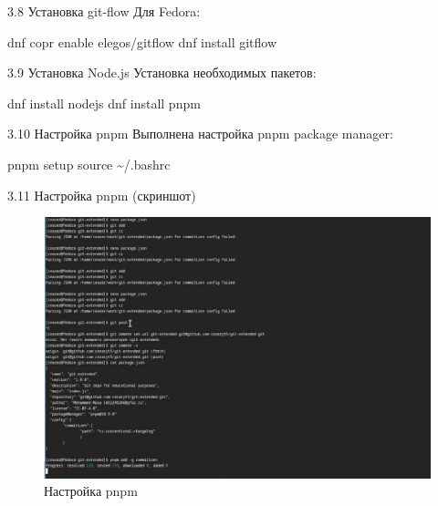 \documentclass[
  ignorenonframetext,
  aspectratio=169,
  russian,
]{beamer}
\newenvironment{Shaded}{\begin{snugshade}}{\end{snugshade}}
\newcommand{\BuiltInTok}[1]{\textcolor[rgb]{0.00,0.23,0.31}{#1}}
\newcommand{\ExtensionTok}[1]{\textcolor[rgb]{0.00,0.23,0.31}{#1}}
\newcommand{\NormalTok}[1]{\textcolor[rgb]{0.00,0.23,0.31}{#1}}
\begin{document}
\begin{frame}[fragile]{3.8 Установка git-flow}
\label{ux443ux441ux442ux430ux43dux43eux432ux43aux430-git-flow}
Для Fedora:

\begin{Shaded}
\begin{Highlighting}[]
\ExtensionTok{dnf}\NormalTok{ copr enable elegos/gitflow}
\ExtensionTok{dnf}\NormalTok{ install gitflow}
\end{Highlighting}
\end{Shaded}
\end{frame}

\begin{frame}[fragile]{3.9 Установка Node.js}
\label{ux443ux441ux442ux430ux43dux43eux432ux43aux430-node.js}
Установка необходимых пакетов:

\begin{Shaded}
\begin{Highlighting}[]
\ExtensionTok{dnf}\NormalTok{ install nodejs}
\ExtensionTok{dnf}\NormalTok{ install pnpm}
\end{Highlighting}
\end{Shaded}
\end{frame}

\begin{frame}[fragile]{3.10 Настройка pnpm}
\label{ux43dux430ux441ux442ux440ux43eux439ux43aux430-pnpm}
Выполнена настройка pnpm package manager:

\begin{Shaded}
\begin{Highlighting}[]
\ExtensionTok{pnpm}\NormalTok{ setup}
\BuiltInTok{source}\NormalTok{ \textasciitilde{}/.bashrc}
\end{Highlighting}
\end{Shaded}
\end{frame}

\begin{frame}{3.11 Настройка pnpm (скриншот)}
\label{ux43dux430ux441ux442ux440ux43eux439ux43aux430-pnpm-ux441ux43aux440ux438ux43dux448ux43eux442}
\begin{figure}[H]

{\centering \includegraphics[width=0.8\linewidth,height=\textheight,keepaspectratio]{image/pnpm.png}

}

\caption{Настройка pnpm}

\end{figure}%
\end{frame}
\end{document}
